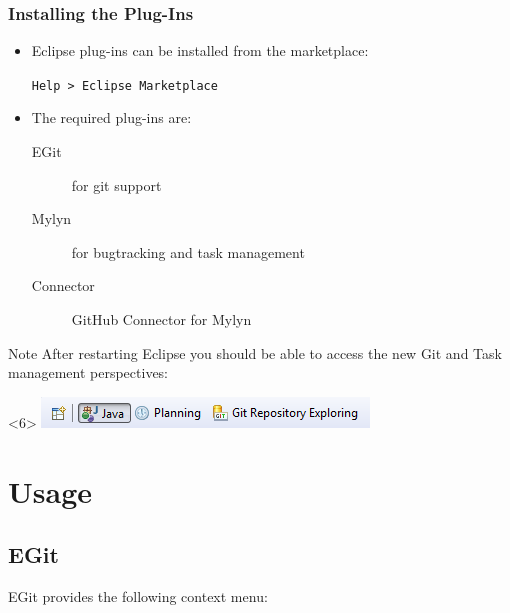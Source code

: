 \documentclass{beamer}
\begin{document}
\begin{frame}[<+->]
  \frametitle{Installing the Plug-Ins}
  \begin{itemize}
	\item Eclipse plug-ins can be installed from the marketplace:
	  
	  \texttt{Help > Eclipse Marketplace}
	\item The required plug-ins are:
	  \begin{description}
		\item[EGit] for git support
		\item[Mylyn] for bugtracking and task management
		\item[Connector] GitHub Connector for Mylyn
	  \end{description}
  \end{itemize}
  \begin{block}{Note}
  	After restarting Eclipse you should be able to access the new Git and Task management perspectives:

	\begin{visibleenv}
	  \includegraphics{perspectives}
	\end{visibleenv}
  \end{block}
\end{frame}

\section{Usage}

\subsection{EGit}
\begin{frame}
EGit provides the following context menu:

\end{frame}
\end{document}
